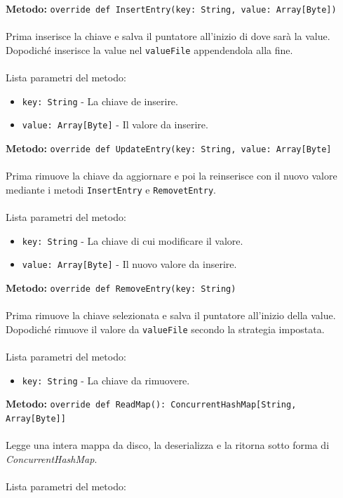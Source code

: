 \documentclass[a4paper]{article}
\begin{document}
		\textbf{Metodo:} \texttt{override def InsertEntry(key: String, value: Array[Byte])}
		\\ \\
		Prima inserisce la chiave e salva il puntatore all'inizio di dove sarà la value. Dopodiché inserisce la value nel \texttt{valueFile} appendendola alla fine.
		\\ \\
		Lista parametri del metodo:
		\begin{itemize}
			\item \texttt{key: String} - La chiave de inserire.
			\item \texttt{value: Array[Byte]} - Il valore da inserire.
		\end{itemize}
		\textbf{Metodo:} \texttt{override def UpdateEntry(key: String, value: Array[Byte]}
		\\ \\
		Prima rimuove la chiave da aggiornare e poi la reinserisce con il nuovo valore mediante i metodi \texttt{InsertEntry} e \texttt{RemovetEntry}.
		\\ \\
		Lista parametri del metodo:
		\begin{itemize}
			\item \texttt{key: String} - La chiave di cui modificare il valore.
			\item \texttt{value: Array[Byte]} - Il nuovo valore da inserire. 
		\end{itemize}
		\textbf{Metodo:} \texttt{override def RemoveEntry(key: String)}
		\\ \\
		Prima rimuove la chiave selezionata e salva il puntatore all'inizio della value. Dopodiché rimuove il valore da \texttt{valueFile} secondo la strategia impostata.
		\\ \\
		Lista parametri del metodo:
		\begin{itemize}
			\item \texttt{key: String} - La chiave da rimuovere.
		\end{itemize}
		\textbf{Metodo:} \texttt{override def ReadMap(): ConcurrentHashMap[String, Array[Byte]]}
		\\ \\
		Legge una intera mappa da disco, la deserializza e la ritorna sotto forma di \emph{ConcurrentHashMap}.
		\\ \\
		Lista parametri del metodo:
		\\ \\
\end{document}

